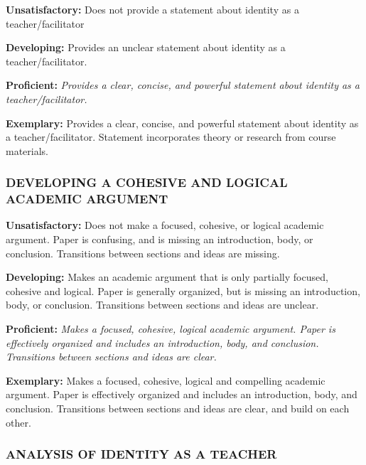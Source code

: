 \documentclass[
]{book}
\begin{document}
\textbf{Unsatisfactory:} Does not provide a statement about identity as a teacher/facilitator

\textbf{Developing:} Provides an unclear statement about identity as a teacher/facilitator.

\textbf{Proficient:} \emph{Provides a clear, concise, and powerful statement about identity as a teacher/facilitator.}

\textbf{Exemplary:} Provides a clear, concise, and powerful statement about identity as a teacher/facilitator. Statement incorporates theory or research from course materials.

\hypertarget{developing-a-cohesive-and-logical-academic-argument}{%
\subsubsection*{DEVELOPING A COHESIVE AND LOGICAL ACADEMIC ARGUMENT}\label{developing-a-cohesive-and-logical-academic-argument}}

\textbf{Unsatisfactory:} Does not make a focused, cohesive, or logical academic argument. Paper is confusing, and is missing an introduction, body, or conclusion. Transitions between sections and ideas are missing.

\textbf{Developing:} Makes an academic argument that is only partially focused, cohesive and logical. Paper is generally organized, but is missing an introduction, body, or conclusion. Transitions between sections and ideas are unclear.

\textbf{Proficient:} \emph{Makes a focused, cohesive, logical academic argument. Paper is effectively organized and includes an introduction, body, and conclusion. Transitions between sections and ideas are clear.}

\textbf{Exemplary:} Makes a focused, cohesive, logical and compelling academic argument. Paper is effectively organized and includes an introduction, body, and conclusion. Transitions between sections and ideas are clear, and build on each other.

\hypertarget{analysis-of-identity-as-a-teacher}{%
\subsubsection*{ANALYSIS OF IDENTITY AS A TEACHER}\label{analysis-of-identity-as-a-teacher}}
\end{document}
